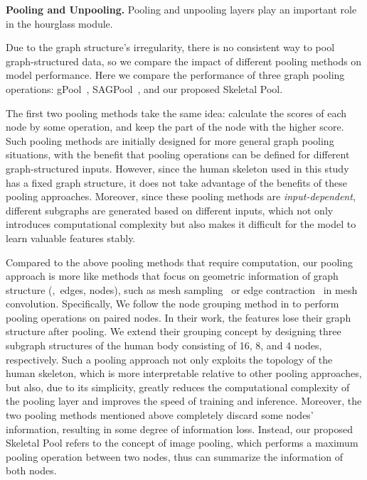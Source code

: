 \documentclass[final]{cvpr}
\begin{document}
\textbf{Pooling and Unpooling.}
Pooling and unpooling layers play an important role in the hourglass module.

Due to the graph structure's irregularity, there is no consistent way to pool graph-structured data, so we compare the impact of different pooling methods on model performance.
Here we compare the performance of three graph pooling operations: gPool~\cite{gao2019graph}, SAGPool~\cite{Lee2019SelfAttentionGP}, and our proposed Skeletal Pool.

The first two pooling methods take the same idea: calculate the scores of each node by some operation, and keep the part of the node with the higher score. 
Such pooling methods are initially designed for more general graph pooling situations, with the benefit that pooling operations can be defined for different graph-structured inputs.
However, since the human skeleton used in this study has a fixed graph structure, it does not take advantage of the benefits of these pooling approaches. 
Moreover, since these pooling methods are \textit{input-dependent}, different subgraphs are generated based on different inputs, which not only introduces computational complexity but also makes it difficult for the model to learn valuable features stably.

Compared to the above pooling methods that require computation, our pooling approach is more like methods that focus on geometric information of graph structure (\eg,~edges, nodes), such as mesh sampling~\cite{COMA:ECCV2018} or edge contraction~\cite{Surface} in mesh convolution.
Specifically, We follow the node grouping method in \cite{zhaoCVPR19semantic} to perform pooling operations on paired nodes. In their work, the features lose their graph structure after pooling.
We extend their grouping concept by designing three subgraph structures of the human body consisting of 16, 8, and 4 nodes, respectively.
Such a pooling approach not only exploits the topology of the human skeleton, which is more interpretable relative to other pooling approaches, 
but also, due to its simplicity, greatly reduces the computational complexity of the pooling layer and improves the speed of training and inference.
Moreover, the two pooling methods mentioned above completely discard some nodes' information, resulting in some degree of information loss. Instead, our proposed Skeletal Pool refers to the concept of image pooling, which performs a maximum pooling operation between two nodes, thus can summarize the information of both nodes.
\end{document}
